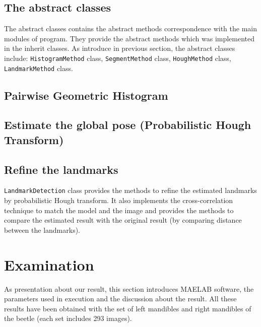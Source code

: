 \subsection*{The abstract classes}
The abstract classes contains the abstract methods correspondence with the main modules of program. They provide the abstract methods which was implemented in the inherit classes. As introduce in previous section, the abstract classes include: \texttt{HistogramMethod} class, \texttt{SegmentMethod} class, \texttt{HoughMethod} class, \texttt{LandmarkMethod} class.

\subsection{Pairwise Geometric Histogram}

\subsection{Estimate the global pose (Probabilistic Hough Transform)}

\subsection{Refine the landmarks}
\texttt{LandmarkDetection} class provides the methods to refine the estimated landmarks by probabilistic Hough transform. It also implements the cross-correlation technique to match the model and the image and provides the methods to compare the estimated result with the original result (by comparing distance between the landmarks).
\fi
\section{Examination}
As presentation about our result, this section introduces MAELAB software, the parameters used in execution and the discussion about the result. All these results have been obtained with the set of left mandibles and right mandibles of the beetle (each set includes 293 images).
